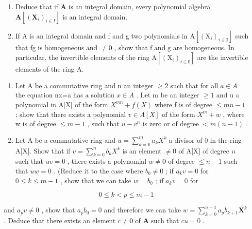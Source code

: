 \begin{enumerate}
\def\labelenumi{(\alph{enumi})}
\setcounter{enumi}{1}
\item
  Deduce that if \(\mathbf{A}\) is an integral domain, every polynomial algebra \(\mathbf{A}[(\mathbf{X}_i)_{i\in I}]\) is an integral domain.
\item
  If A is an integral domain and f and g two polynomials in \(\mathrm{A}[(\mathrm{X}_{i})_{i\in\mathbf{I}}]\) such that fg is homogeneous and \(\neq0\) , show that f and g are homogeneous. In particular, the invertible elements of the ring \(\mathrm{A}[(\mathrm{X}_{i})_{i\in\mathbf{I}}]\) are the invertible elements of the ring A.
\end{enumerate}

\begin{enumerate}
\def\labelenumi{\arabic{enumi}.}
\setcounter{enumi}{14}
\item
  Let A be a commutative ring and n an integer \(\geqslant2\) such that for all \(a\in A\) the equation nx=a has a solution \(x\in A\) . Let m be an integer \(\geqslant1\) and u a polynomial in A{[}X{]} of the form \(X^{mn}+f(X)\) where f is of degree \(\leqslant mn-1\) ; show that there exists a polynomial \(v\in A[X]\) of the form \(X^{m}+w\) , where w is of degree \(\leqslant m-1\) , such that \(u-v^{n}\) is zero or of degree \(<m(n-1)\) .
\item
  Let A be a commutative ring and \(u = \sum_{k=0}^{m} a_k X^k\) a divisor of 0 in the ring A{[}X{]}. Show that if \(v = \sum_{k=0}^{n} b_k X^k\) is an element \(\neq 0\) of A{[}X{]} of degree \(n\) such that \(uv = 0\) , there exists a polynomial \(w \neq 0\) of degree \(\leqslant n - 1\) such that \(uw = 0\) . (Reduce it to the case where \(b_0 \neq 0\) ; if \(a_k v = 0\) for \(0 \leqslant k \leqslant m - 1\) , show that we can take \(w = b_0\) ; if \(a_k v = 0\) for
\end{enumerate}

\[
0 \leqslant k <   p \leqslant m - 1
\]

and \(a_{p}v \neq 0\) , show that \(a_{p}b_{0} = 0\) and therefore we can take \(w = \sum_{k=0}^{n-1} a_{p}b_{k+1}\mathbf{X}^{k}\) . Deduce that there exists an element \(c \neq 0\) of \(\mathbf{A}\) such that \(cu = 0\) .

